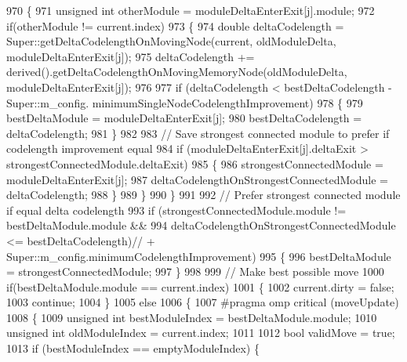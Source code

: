 \begin{DoxyCode}
{970         \{
971             \textcolor{keywordtype}{unsigned} \textcolor{keywordtype}{int} otherModule = moduleDeltaEnterExit[j].module;
972             \textcolor{keywordflow}{if}(otherModule != current.index)
973             \{
974                 \textcolor{keywordtype}{double} deltaCodelength = Super::getDeltaCodelengthOnMovingNode(current, oldModuleDelta, 
      moduleDeltaEnterExit[j]);
975                 deltaCodelength += derived().getDeltaCodelengthOnMovingMemoryNode(oldModuleDelta, 
      moduleDeltaEnterExit[j]);
976 
977                 \textcolor{keywordflow}{if} (deltaCodelength < bestDeltaCodelength - Super::m\_config.
      minimumSingleNodeCodelengthImprovement)
978                 \{
979                     bestDeltaModule = moduleDeltaEnterExit[j];
980                     bestDeltaCodelength = deltaCodelength;
981                 \}
982 
983                 \textcolor{comment}{// Save strongest connected module to prefer if codelength improvement equal}
984                 \textcolor{keywordflow}{if} (moduleDeltaEnterExit[j].deltaExit > strongestConnectedModule.deltaExit)
985                 \{
986                     strongestConnectedModule = moduleDeltaEnterExit[j];
987                     deltaCodelengthOnStrongestConnectedModule = deltaCodelength;
988                 \}
989             \}
990         \}
991 
992         \textcolor{comment}{// Prefer strongest connected module if equal delta codelength}
993         \textcolor{keywordflow}{if} (strongestConnectedModule.module != bestDeltaModule.module &&
994                 deltaCodelengthOnStrongestConnectedModule <= bestDeltaCodelength)\textcolor{comment}{// +
       Super::m\_config.minimumCodelengthImprovement)}
995         \{
996             bestDeltaModule = strongestConnectedModule;
997         \}
998 
999         \textcolor{comment}{// Make best possible move}
1000         \textcolor{keywordflow}{if}(bestDeltaModule.module == current.index)
1001         \{
1002             current.dirty = \textcolor{keyword}{false};
1003             \textcolor{keywordflow}{continue};
1004         \}
1005         \textcolor{keywordflow}{else}
1006         \{
1007 \textcolor{preprocessor}{#pragma omp critical (moveUpdate)}
1008             \{
1009                 \textcolor{keywordtype}{unsigned} \textcolor{keywordtype}{int} bestModuleIndex = bestDeltaModule.module;
1010                 \textcolor{keywordtype}{unsigned} \textcolor{keywordtype}{int} oldModuleIndex = current.index;
1011 
1012                 \textcolor{keywordtype}{bool} validMove = \textcolor{keyword}{true};
1013                 \textcolor{keywordflow}{if} (bestModuleIndex == emptyModuleIndex)    \{
}
\end{DoxyCode}
